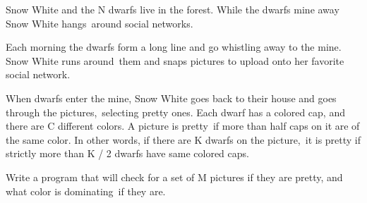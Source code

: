 Snow White and the N dwarfs live in the forest. While the dwarfs mine away Snow White hangs around social networks.  

   Each morning the dwarfs form a long line and go whistling away to the mine. Snow White runs around them and snaps pictures to upload onto her favorite social network.  

   When dwarfs enter the mine, Snow White goes back to their house and goes through the pictures, selecting pretty ones. Each dwarf has a colored cap, and there are C different colors. A picture is pretty if more than half caps on it are of the same color. In other words, if there are K dwarfs on the picture, it is pretty if strictly more than K / 2 dwarfs have same colored caps.  

   Write a program that will check for a set of M pictures if they are pretty, and what color is dominating if they are.